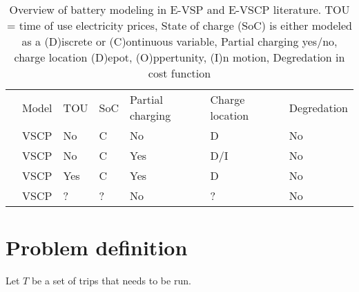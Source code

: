 \documentclass[]{article}
\begin{document}
\begin{table}[h]
  \centering
  \begin{tabular}{cllllll}
      \toprule
      & Model & TOU & SoC & Partial charging & Charge location & Degredation \\
      \cmidrule(lr){2-7}
      \cite{PERUMAL2021105268} & VSCP & No & C & No & D & No  \\
      \cite{SISTIG2023120915} & VSCP & No & C & Yes & D/I & No \\
      \cite{su14063627} & VSCP & Yes & C & Yes & D & No \\
      \cite{SHEN2023} & VSCP & ? & ? & No & ? & No \\
      \bottomrule
  \end{tabular}
  \caption{Overview of battery modeling in E-VSP and E-VSCP literature. TOU = time of use electricity prices, State of charge (SoC) is either modeled as a (D)iscrete or (C)ontinuous variable, Partial charging yes/no, charge location (D)epot, (O)ppertunity, (I)n motion, Degredation in cost function}
  \label{tab:evscp-lit}
\end{table}

\section{Problem definition}
Let $T$ be a set of trips that needs to be run. 
\printbibliography
\end{document}
